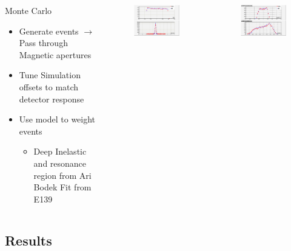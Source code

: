 \documentclass[12pt]{beamer}
\begin{document}
\begin{frame}{}
\begin{columns}
	\begin{block}{Monte Carlo}
		\begin{itemize}
			\item Generate events $\rightarrow$ Pass through Magnetic apertures
			\item Tune Simulation offsets to match detector response
			\item Use model to weight events
			\begin{itemize}
				\item Deep Inelastic and resonance region from Ari Bodek Fit from E139 
			\end{itemize}
		\end{itemize}
		\cite{bodek}  
	\end{block}
	\vspace{-20pt}
	\begin{figure}
		\includegraphics[width=6cm]{../images/dp_ytar_1207.png}
	\end{figure}
	\vspace{-30pt}
	\begin{figure}
		\includegraphics[width=6cm]{../images/xp_yp_foc_1207.png}
	\end{figure}
\end{columns}
\end{frame}



\subsection[Results]{Results}
\end{document}
